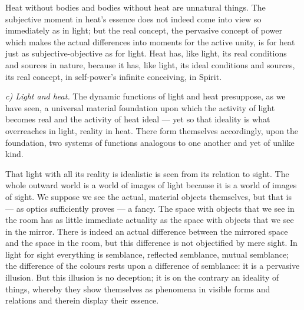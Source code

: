 \documentclass[12pt,a4paper]{book}
\newcommand{\runin}[1]{\emph{#1}\hspace{0.4em}}
\begin{document}
Heat without bodies and bodies without heat are
unnatural things. The subjective moment in heat's essence does not indeed come into view so immediately as in light; but
the real concept, the pervasive concept of power which makes the actual differences into moments for the active unity, is
for heat just as subjective-objective as for light. Heat has, like light, its real conditions and sources in nature,
because it has, like light, its ideal conditions and sources, its real concept, in self-power's infinite conceiving, in
Spirit.

\runin{c) Light and heat.} The dynamic functions of light and heat presuppose, as we have seen, a universal material
foundation upon which the activity of light becomes real and the activity of heat ideal --- yet so that ideality is what
overreaches in light, reality in heat. There form themselves accordingly, upon the foundation, two systems of functions
analogous to one another and yet of unlike kind.

That light with all its reality is idealistic is seen from its relation to sight. The whole outward world is a world of
images of light because it is a world of images of sight. We suppose we see the actual, material objects themselves, but
that is --- as optics sufficiently proves --- a fancy. The space with objects that we see in the room has as little
immediate actuality as the space with objects that we see in the mirror. There is indeed an actual difference between the
mirrored space and the space in the room, but this difference is not objectified by mere sight. In light for sight
everything is semblance, reflected semblance, mutual semblance; the difference of the colours rests upon a difference of
semblance: it is a pervasive illusion. But this illusion is no deception; it is on the contrary an ideality of things,
whereby they show themselves as phenomena in visible forms and relations and therein display their essence.
\end{document}
